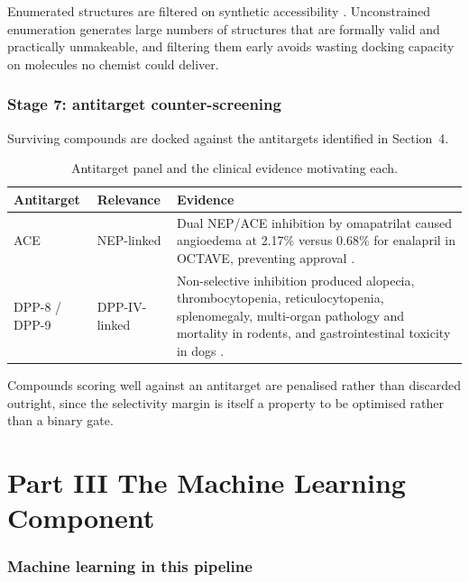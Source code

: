 \documentclass[11pt,a4paper]{article}
\begin{document}
Enumerated structures are filtered on synthetic accessibility
\cite{ertl2009}. Unconstrained enumeration generates large numbers of
structures that are formally valid and practically unmakeable, and filtering
them early avoids wasting docking capacity on molecules no chemist could
deliver.

\section{Stage 7: antitarget counter-screening}
\label{sec:counterscreen}

Surviving compounds are docked against the antitargets identified in Section~4.

\begin{table}[htbp]
\centering
\small
\caption{Antitarget panel and the clinical evidence motivating each.}
\begin{tabular}{llp{8.2cm}}
\toprule
\textbf{Antitarget} & \textbf{Relevance} & \textbf{Evidence} \\
\midrule
ACE & NEP-linked & Dual NEP/ACE inhibition by omapatrilat caused angioedema at
2.17\% versus 0.68\% for enalapril in OCTAVE, preventing approval
\cite{kostis2004,packer2002}. \\
\addlinespace
DPP-8 / DPP-9 & DPP-IV-linked & Non-selective inhibition produced alopecia,
thrombocytopenia, reticulocytopenia, splenomegaly, multi-organ pathology and
mortality in rodents, and gastrointestinal toxicity in dogs
\cite{lankas2005}. \\
\bottomrule
\end{tabular}
\end{table}

Compounds scoring well against an antitarget are penalised rather than
discarded outright, since the selectivity margin is itself a property to be
optimised rather than a binary gate.

\newpage
\part*{Part III \quad The Machine Learning Component}

\section{Machine learning in this pipeline}
\label{sec:ml}
\end{document}
